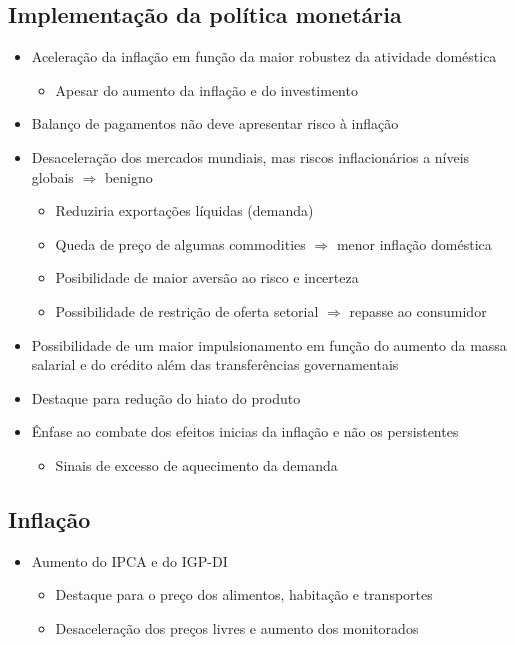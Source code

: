 \documentclass[11pt]{article}
\begin{document}
\subsection*{Implementação da política monetária}
\label{sec:orgc802dda}
\begin{itemize}
\item Aceleração da inflação em função da maior robustez da atividade doméstica
\begin{itemize}
\item Apesar do aumento da inflação e do investimento
\end{itemize}
\item Balanço de pagamentos não deve apresentar risco à inflação
\item Desaceleração dos mercados mundiais, mas riscos inflacionários a níveis globais \(\Rightarrow\) benigno
\begin{itemize}
\item Reduziria exportações líquidas (demanda)
\item Queda de preço de algumas commodities \(\Rightarrow\) menor inflação doméstica
\item Posibilidade de maior aversão ao risco e incerteza
\item Possibilidade de restrição de oferta setorial \(\Rightarrow\) repasse ao consumidor
\end{itemize}
\item Possibilidade de um maior impulsionamento em função do aumento da massa salarial e do crédito além das transferências governamentais
\item Destaque para redução do hiato do produto
\item Ênfase ao combate dos efeitos inicias da inflação e não os persistentes
\begin{itemize}
\item Sinais de excesso de aquecimento da demanda
\end{itemize}
\end{itemize}
\subsection*{Inflação}
\label{sec:org3a3a211}
\begin{itemize}
\item Aumento do IPCA e do IGP-DI
\begin{itemize}
\item Destaque para o preço dos alimentos, habitação e transportes
\item Desaceleração dos preços livres e aumento dos monitorados
\end{itemize}
\end{itemize}
\end{document}
